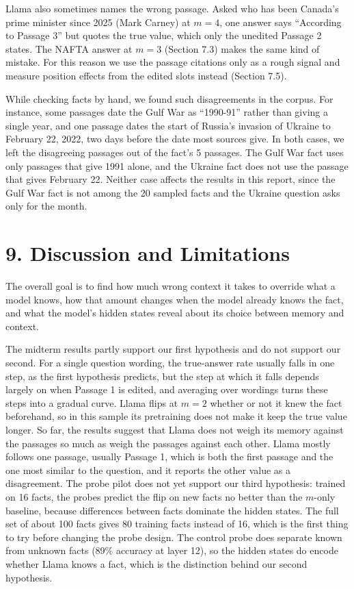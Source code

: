 \documentclass[
  12pt,
  letterpaper,
]{article}
\begin{document}
Llama also sometimes names the wrong passage.
Asked who has been Canada's prime minister since
2025 (Mark Carney) at \(m = 4\), one answer says
``According to Passage 3'' but quotes the true
value, which only the unedited Passage 2 states.
The NAFTA answer at \(m = 3\) (Section 7.3) makes
the same kind of mistake. For this reason we use
the passage citations only as a rough signal and
measure position effects from the edited slots
instead (Section 7.5).

While checking facts by hand, we found such
disagreements in the corpus. For instance, some
passages date the Gulf War as ``1990-91'' rather
than giving a single year, and one passage dates
the start of Russia's invasion of Ukraine to
February 22, 2022, two days before the date most
sources give. In both cases, we left the
disagreeing passages out of the fact's 5 passages.
The Gulf War fact uses only passages that give
1991 alone, and the Ukraine fact does not use the
passage that gives February 22. Neither case
affects the results in this report, since the Gulf
War fact is not among the 20 sampled facts and the
Ukraine question asks only for the month.

\section{9. Discussion and
Limitations}\label{discussion-and-limitations}

The overall goal is to find how much wrong context
it takes to override what a model knows, how that
amount changes when the model already knows the
fact, and what the model's hidden states reveal
about its choice between memory and context.

The midterm results partly support our first
hypothesis and do not support our second. For a
single question wording, the true-answer rate
usually falls in one step, as the first hypothesis
predicts, but the step at which it falls depends
largely on when Passage 1 is edited, and averaging
over wordings turns these steps into a gradual
curve. Llama flips at \(m = 2\) whether or not it
knew the fact beforehand, so in this sample its
pretraining does not make it keep the true value
longer. So far, the results suggest that Llama
does not weigh its memory against the passages so
much as weigh the passages against each other.
Llama mostly follows one passage, usually Passage
1, which is both the first passage and the one
most similar to the question, and it reports the
other value as a disagreement. The probe pilot
does not yet support our third hypothesis: trained
on 16 facts, the probes predict the flip on new
facts no better than the \(m\)-only baseline,
because differences between facts dominate the
hidden states. The full set of about 100 facts
gives 80 training facts instead of 16, which is
the first thing to try before changing the probe
design. The control probe does separate known from
unknown facts (89\% accuracy at layer 12), so the
hidden states do encode whether Llama knows a
fact, which is the distinction behind our second
hypothesis.
\end{document}
